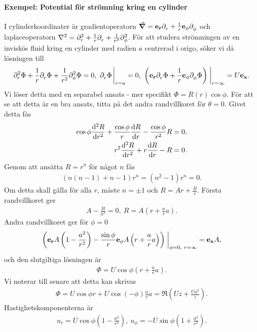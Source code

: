 \paragraph{Exempel: Potential för strömning kring en cylinder}
I cylinderkoordinater är gradientoperatorn $\grad = \ub{r}\del{r} + \frac{1}{r}\ub{\phi}\del{\phi}$ och laplaceoperatorn $\laplacian = \del[2]{r} + \frac{1}{r}\del{r} + \frac{1}{r^{2}}\del[2]{\phi}$. För att studera strömningen av en inviskös fluid kring en cylinder med radien $a$ centrerad i origo, söker vi då lösningen till
\begin{align*}
	\del[2]{r}{\Phi} + \frac{1}{r}\del{r}{\Phi} + \frac{1}{r^{2}}\del[2]{\phi}{\Phi} = 0,\ \del{r}{\Phi}\eval_{r = a} = 0,\ \left(\ub{r}\del{r}{\Phi} + \frac{1}{r}\ub{\phi}\del{\phi}{\Phi}\right)\eval_{r = \infty} = U\ub{x}.
\end{align*}
Vi löser detta med en separabel ansats - mer specifikt $\Phi = R(r)\cos{\phi}$. För att se att detta är en bra ansats, titta på det andra randvillkoret för $\theta = 0$. Givet detta fås
\begin{align*}
	\cos{\phi}\dv[2]{R}{r} + \frac{\cos{\phi}}{r}\dv{R}{r} - \frac{\cos{\phi}}{r^{2}}R &= 0, \\
	r^{2}\dv[2]{R}{r} + r\dv{R}{r} - R                                                 &= 0.
\end{align*}
Genom att ansätta $R = r^{n}$ för något $n$ fås
\begin{align*}
	(n(n - 1) + n - 1)r^{n} = (n^{2} - 1)r^{n} = 0.
\end{align*}
Om detta skall gälla för alla $r$, måste $n = \pm 1$ och $R = Ar + \frac{B}{r}$. Första randvillkoret ger
\begin{align*}
	A - \frac{B}{a^{2}} = 0,\ R = A\left(r + \frac{a}{r}a\right).
\end{align*}
Andra randvillkoret ger för $\phi = 0$
\begin{align*}
	\left(\ub{r}A\left(1 - \frac{a^{2}}{r^{2}}\right) - \frac{\sin{\phi}}{r}\ub{\phi}A\left(r + \frac{a}{r}a\right)\right)\eval_{\phi = 0,\ r = \infty} = \ub{x}A,
\end{align*}
och den slutgiltiga lösningen är
\begin{align*}
	\Phi = U\cos{\phi}\left(r + \frac{a}{r}a\right).
\end{align*}
Vi noterar till senare att detta kan skrivas
\begin{align*}
	\Phi = U\cos{\phi}r + U\cos(-\phi)\frac{a}{r}a = \Re\left(Uz + \frac{Ua^{2}}{z}\right).
\end{align*}
Hastighetskomponenterna är
\begin{align*}
	u_{r} = U\cos{\phi}\left(1 - \frac{a^{2}}{r^{2}}\right),\ u_{\phi} = -U\sin{\phi}\left(1 + \frac{a^{2}}{r^{2}}\right).
\end{align*}

